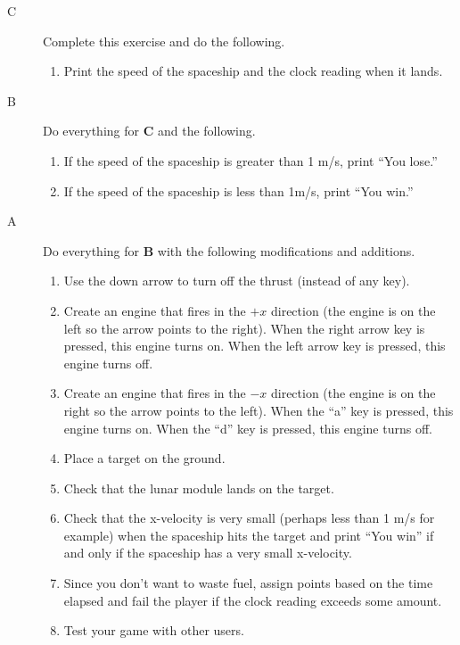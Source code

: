 \begin{description}

\item[C] Complete this exercise and do the following.

\begin{enumerate}
	\item Print the speed of the spaceship and the clock reading when it lands.
\end{enumerate}


\item[B] Do everything for {\bf C} and the following.

\begin{enumerate}
	\item If the speed of the spaceship is greater than 1 m/s, print ``You lose.''
	\item If the speed of the spaceship is less than 1m/s, print ``You win.''
\end{enumerate}

\item[A] Do everything for {\bf B} with the following modifications and additions.

\begin{enumerate}
	\item Use the down arrow to turn off the thrust (instead of any key).
	\item Create an engine that fires in the $+x$ direction (the engine is on the left so the arrow points to the right). When the right arrow key is pressed, this engine turns on. When the left arrow key is pressed, this engine turns off.
	\item Create an engine that fires in the $-x$ direction (the engine is on the right so the arrow points to the left). When the ``a'' key is pressed, this engine turns on. When the ``d'' key is pressed, this engine turns off.
	\item Place a target on the ground.
	\item Check that the lunar module lands on the target.
	\item Check that the x-velocity is very small (perhaps less than 1 m/s for example) when the spaceship hits the target and print ``You win'' if and only if the spaceship has a very small x-velocity.
	\item Since you don't want to waste fuel, assign points based on the time elapsed and fail the player if the clock reading exceeds some amount.
	\item Test your game with other users.	
\end{enumerate}




\end{description}

